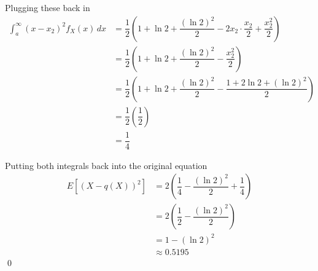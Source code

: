 \documentclass[11pt]{article}
\begin{document}
\begin{enumerate}[label=(\alph*)]
\begin{solution}
        Plugging these back in
        \begin{align*}
            \int_a^\infty (x - x_2)^2 f_X(x)\, dx &= \dfrac{1}{2} \left( 1 + \ln{2} + \dfrac{(\ln{2})^2}{2} - 2x_2 \cdot \dfrac{x_2}{2} + \dfrac{x_2^2}{2} \right) \\
            &= \dfrac{1}{2} \left( 1 + \ln{2} + \dfrac{(\ln{2})^2}{2} - \dfrac{x_2^2}{2} \right) \\
            &= \dfrac{1}{2} \left( 1 + \ln{2} + \dfrac{(\ln{2})^2}{2} - \dfrac{1 + 2\ln{2} + (\ln{2})^2}{2} \right) \\
            &= \dfrac{1}{2} \left( \dfrac{1}{2} \right) \\
            &= \dfrac{1}{4}
        \end{align*}

        Putting both integrals back into the original equation
        \begin{align*}
            E[(X - q(X))^2] &= 2\left( \dfrac{1}{4} - \dfrac{(\ln{2})^2}{2} + \dfrac{1}{4} \right) \\
            &= 2\left( \dfrac{1}{2} - \dfrac{(\ln{2})^2}{2} \right) \\
            &= 1 - (\ln{2})^2 \\
            &\approx 0.5195
        \end{align*}
        \qed
    \end{solution}

\end{enumerate}
\end{document}
